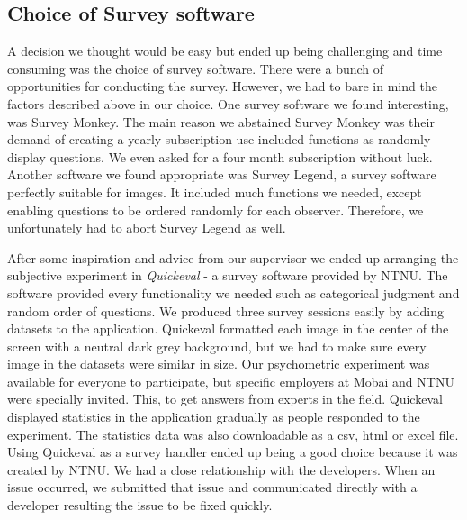 \subsection*{Choice of Survey software}
\label{subsection:choicesoftware}
A decision we thought would be easy but ended up being challenging and time consuming was the choice of survey software. There were a bunch of opportunities for conducting the survey. However, we had to bare in mind the factors described above in our choice. One survey software we found interesting, was Survey Monkey. The main reason we abstained Survey Monkey was their demand of creating a yearly subscription use included functions as randomly display questions. We even asked for a four month subscription without luck. Another software we found appropriate was Survey Legend, a survey software perfectly suitable for images. It included much functions we needed, except enabling questions to be ordered randomly for each observer. Therefore, we unfortunately had to abort Survey Legend as well. 

After some inspiration and advice from our supervisor we ended up arranging the subjective experiment in \textit{Quickeval} - a survey software provided by NTNU. The software provided every functionality we needed such as categorical judgment and random order of questions. We produced three survey sessions easily by adding datasets to the application. Quickeval formatted each image in the center of the screen with a neutral dark grey background, but we had to make sure every image in the datasets were similar in size. Our psychometric experiment was available for everyone to participate, but specific employers at Mobai and NTNU were specially invited. This, to get answers from experts in the field. Quickeval displayed statistics in the application gradually as people responded to the experiment. The statistics data was also downloadable as a csv, html or excel file. 
Using Quickeval as a survey handler ended up being a good choice because it was created by NTNU. We had a close relationship with the developers. When an issue occurred, we submitted that issue and communicated directly with a developer resulting the issue to be fixed quickly. 

